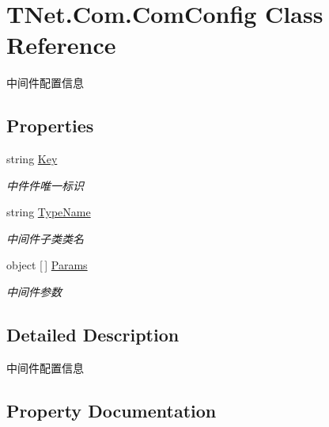 \hypertarget{class_t_net_1_1_com_1_1_com_config}{}\section{T\+Net.\+Com.\+Com\+Config Class Reference}
\label{class_t_net_1_1_com_1_1_com_config}


中间件配置信息  


\subsection*{Properties}
\begin{DoxyCompactItemize}
\item 
string \mbox{\hyperlink{class_t_net_1_1_com_1_1_com_config_a3018a60a0cc23afc5bc85b994005ab47}{Key}}
\begin{DoxyCompactList}\small\item\em 中件件唯一标识 \end{DoxyCompactList}\item 
string \mbox{\hyperlink{class_t_net_1_1_com_1_1_com_config_ab79b0fcd0a2cfa9d74ee23ad01ac42e5}{Type\+Name}}
\begin{DoxyCompactList}\small\item\em 中间件子类类名 \end{DoxyCompactList}\item 
object \mbox{[}$\,$\mbox{]} \mbox{\hyperlink{class_t_net_1_1_com_1_1_com_config_af53b050637c00eb2612eb15083713d56}{Params}}
\begin{DoxyCompactList}\small\item\em 中间件参数 \end{DoxyCompactList}\end{DoxyCompactItemize}


\subsection{Detailed Description}
中间件配置信息 



\subsection{Property Documentation}
\mbox{\label{class_t_net_1_1_com_1_1_com_config_a3018a60a0cc23afc5bc85b994005ab47}} 
